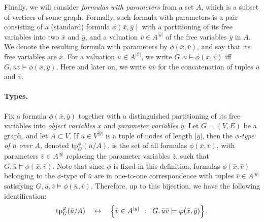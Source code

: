 Finally, we will consider \emph{formulas with parameters}
from a set $A$, which is a subset of vertices of some graph.
Formally, such formula with parameters is a pair consisting of a (standard) formula $\phi(\bar x,\bar y)$
with a partitioning of its free variables into two $\bar x$ and $\bar y$,
and a valuation $\bar v\in A^{|\bar y|}$ of the free variables $\bar y$ in $A$.
We denote the resulting formula with parameters by $\phi(\bar x,\bar v)$, and say that its free variables 
are $\bar x$. For a valuation $\bar u\in A^{|\bar x|}$,
we write $G,\bar u\models \phi(\bar x,\bar v)$
iff $G,\bar u\bar v\models \phi(\bar x,\bar y)$. Here and later on, we write $\bar u\bar v$ for the concatenation of tuples $\bar u$ and $\bar v$.

\newcommand{\tp}{\mathrm{tp}}

\paragraph{Types.}
Fix a formula $\phi(\bar x,\bar y)$ together with a distinguished partitioning of its free variables into 
\emph{object variables} $\bar x$ and \emph{parameter variables} $\bar y$. 
Let $G=(V,E)$ be a graph, and let $A\subset V$.
If $\bar u\in V^{|\bar y|}$ is a tuple of 
nodes of length $|\bar y|$, then the 
\emph{$\phi$-type of $\bar u$ over $A$},
denoted $\tp^\phi_G(\bar u/A)$,
is the set of all
formulas $\phi(\bar x,\bar v)$,
with parameters $\bar v\in A^{|\bar y|}$
replacing the parameter variables $\bar z$,
such that $G,\bar u\models \phi(\bar x,\bar v)$.
Note that since $\phi$ is fixed in this definition, formulas $\phi(\bar x,\bar v)$ belonging to the $\phi$-type of $\bar u$ are in one-to-one correspondence
with tuples $\bar v\in A^{|\bar y|}$ satisfying $G,\bar u,\bar v\models \phi(\bar u,\bar v)$.
Therefore, up to this bijection, we have the following identification:
\begin{equation*}\label{eq:bijection}
\tp^\phi_G(\bar u/A)\quad\leftrightarrow\quad\setof{\bar v\in  A^{|\bar y|}}{G, \bar u\bar v\models \phi(\bar x,\bar y)}.
\end{equation*}

